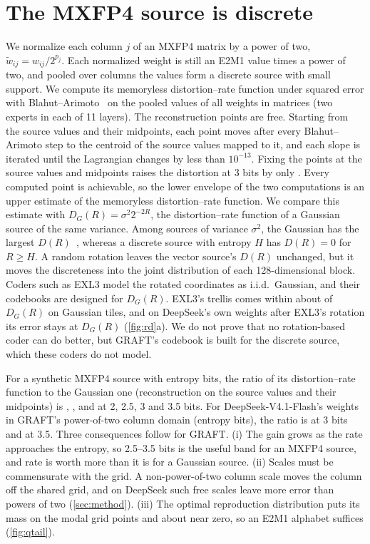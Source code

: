 \section{The MXFP4 source is discrete}
\label{sec:theory}

We normalize each column $j$ of an MXFP4 matrix by a power of two, $\tilde w_{ij}=w_{ij}/2^{p_j}$. Each normalized
weight is still an E2M1 value times a power of two, and pooled over columns the values form a discrete source with
small support. We compute its memoryless distortion--rate function under squared error with
Blahut--Arimoto~\citep{blahut1972,arimoto1972} on the pooled values of all weights in  matrices (two
experts in each of 11 layers). The reconstruction points are free. Starting from the source values and their
midpoints, each point moves after every Blahut--Arimoto step to the centroid of the source values mapped to it, and
each slope is iterated until the Lagrangian changes by less than $10^{-13}$. Fixing the points at the source values
and midpoints raises the distortion at 3 bits by only . Every computed point is achievable, so the
lower envelope of the two computations is an upper estimate of the memoryless distortion--rate function. We compare
this estimate with $D_G(R)=\sigma^2 2^{-2R}$, the distortion--rate function of a Gaussian source of the same variance.
Among sources of variance $\sigma^2$, the
Gaussian has the largest $D(R)$~\citep{cover2006}, whereas a discrete source with entropy $H$ has $D(R)=0$ for
$R\ge H$. A random rotation leaves the vector source's $D(R)$ unchanged, but it moves the discreteness into the joint
distribution of each 128-dimensional block. Coders such as EXL3 model the rotated coordinates as i.i.d.\ Gaussian, and
their codebooks are designed for $D_G(R)$. EXL3's trellis comes within about  of $D_G(R)$ on
Gaussian tiles, and on DeepSeek's own weights after EXL3's rotation its error stays at  $D_G(R)$
(\cref{fig:rd}a). We do not prove that no rotation-based coder can do better, but GRAFT's codebook is built for the
discrete source, which these coders do not model.

For a synthetic MXFP4 source with entropy  bits, the ratio of its distortion--rate function to the
Gaussian one (reconstruction on the source values and their midpoints) is , ,  and  at 2, 2.5, 3 and 3.5 bits. For
DeepSeek-V4.1-Flash's weights in GRAFT's power-of-two column domain (entropy  bits), the ratio is
 at 3 bits and  at 3.5. Three consequences follow for GRAFT.
(i) The gain grows as the rate approaches the entropy, so 2.5--3.5 bits is the useful band for an MXFP4 source,
and rate is worth more than it is for a Gaussian source. (ii) Scales must be commensurate with the grid. A
non-power-of-two column scale moves the column off the shared grid, and on DeepSeek such free scales leave
 more error than powers of two (\cref{sec:method}). (iii) The optimal reproduction distribution puts its mass on the modal grid points and about  near zero, so an E2M1 alphabet suffices (\cref{fig:qtail}).

